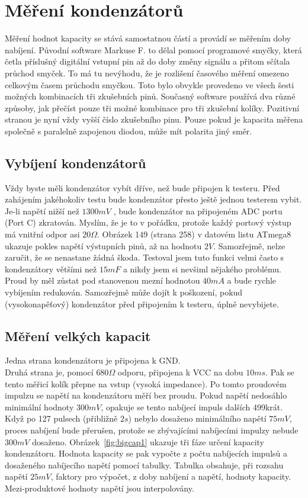 \section{Měření kondenzátorů}
Měření hodnot kapacity se stává samostatnou částí a provádí se měřením doby nabíjení.
Původní software Markuse F. to dělal pomocí programové smyčky, která četla příslušný digitální
vstupní pin až do doby změny signálu a přitom sčítala průchod smyček.
To má tu nevýhodu, že je rozlišení časového měření omezeno celkovým časem průchodu smyčkou.
Toto bylo obvykle provedeno ve všech šesti možných kombinacích tři zkušebních pinů.
Současný software používá dva různé způsoby, jak přečíst pouze tři
možné kombinace pro tři zkušební kolíky.
Pozitivní stranou je nyní vždy vyšší číslo zkušebního pinu.
Pouze pokud je kapacita měřena společně s paralelně zapojenou diodou,
může mít polarita jiný směr.

\subsection{Vybíjení kondenzátorů}
Vždy byste měli kondenzátor vybít dříve, než bude připojen k testeru.
Před zahájením jakéhokoliv testu bude kondenzátor přesto ještě jednou testerem vybit.
Je-li napětí nižší než \(1300mV\) ,  bude kondenzátor na připojeném ADC portu (Port C) zkratován.
Myslím, že je to v pořádku, protože každý portový výstup má vnitřní odpor asi \(20\Omega\).
Obrázek 149 (strana 258) v datovém listu ATmega8 \cite{ATmega8} ukazuje pokles napětí výstupních pinů,
až na hodnotu \(2V\). Samozřejmě, nelze zaručit, že se nenastane žádná škoda.
Testoval jsem tuto funkci velmi často s kondenzátory většími než \(15mF\)  a nikdy jsem
si nevšiml nějakého problému.
Proud by měl zůstat pod stanovenou mezní hodnotou \(40mA\) a bude rychle vybíjením redukován.
Samozřejmě může dojít k poškození, pokud (vysokonapěťový) kondenzátor před připojením k testeru, úplně nevybijete.
\subsection{Měření velkých kapacit}
\label{sec:bigcap}
Jedna strana kondenzátoru je připojena k GND.\\
Druhá strana je, pomocí \(680\Omega\) odporu, připojena k VCC na dobu \(10ms\).
Pak se tento měřicí kolík přepne na vstup (vysoká impedance).
Po tomto proudovém impulzu se napětí na kondenzátoru měří bez proudu.
Pokud napětí nedosáhlo minimální hodnoty \(300mV\), opakuje se tento nabíjecí impuls dalších 499krát.
Když po 127 pulsech (přibližně \(2s\)) nebylo dosaženo minimálního napětí \(75mV\),
proces nabíjení bude přerušen, protože se zbývajícími nabíjecími impulzy nebude \(300mV\) dosaženo.
Obrázek~\ref{fig:bigcap1} ukazuje tři fáze určení kapacity kondenzátoru.
Hodnota kapacity se pak vypočte z počtu nabíjecích impulsů a dosaženého nabíjecího napětí pomocí tabulky.
Tabulka obsahuje, při rozsahu napětí \(25mV\), faktory pro výpočet, z doby nabíjení a napětí, hodnoty kapacity.
Mezi-produktové hodnoty napětí jsou interpolovány.

